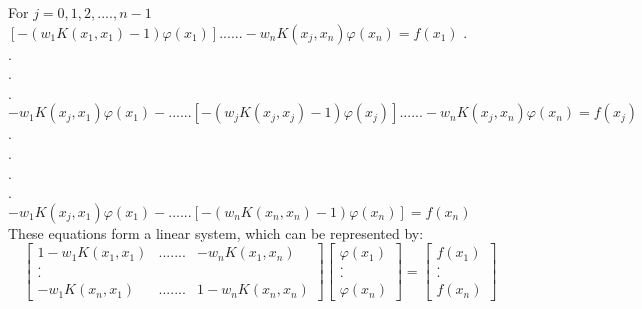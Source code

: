 \documentclass[../document.tex]{subfiles}
\begin{document}
For $j=0,1,2,....,n-1$\newline
$
\left[ -(w_1 K(x_1,x_1) - 1)\varphi(x_1)  \right] 
......  -w_n K(x_j,x_n) \varphi(x_n) = f(x_1)
$
.\\.\\.\\.\\
$
-w_1 K(x_j,x_1)\varphi(x_1) -...... 
\left[ -(w_j K(x_j,x_j) - 1)\varphi(x_j)  \right] 
......  -w_n K(x_j,x_n) \varphi(x_n) = f(x_j)
$
.\\.\\.\\.\\
$
-w_1 K(x_j,x_1)\varphi(x_1) -...... 
\left[ -(w_n K(x_n,x_n) - 1)\varphi(x_n)  \right]  = f(x_n)
$
\\These equations form a linear system, which can be represented by:
$$
\begin{bmatrix}
	1 -w_1 K(x_1,x_1) &   ....... & -w_n K(x_1,x_n) \\
	.\\.\\
	-w_1 K(x_n,x_1)   &   ....... & 1-w_n K(x_n,x_n) 
\end{bmatrix}
\begin{bmatrix}
	\varphi(x_1) \\
	.\\.\\
	\varphi(x_n) 
\end{bmatrix}
=
\begin{bmatrix}
	f(x_1) \\
	.\\.\\
	f(x_n)
\end{bmatrix}
$$
\end{document}
